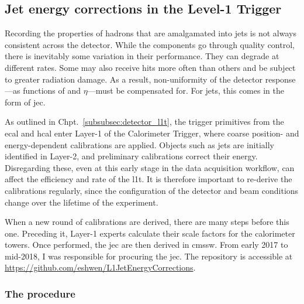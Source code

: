 

\subsection{Jet energy corrections in the Level-1 Trigger}
\label{subsec:detector_jecs}

Recording the properties of hadrons that are amalgamated into \glspl{jet} is not always consistent across the detector. While the components go through quality control, there is inevitably some variation in their performance. They can degrade at different rates. Some may also receive hits more often than others and be subject to greater radiation damage. As a result, non-uniformity of the detector response---as functions of \pt and $\eta$---must be compensated for. For \glspl{jet}, this comes in the form of \gls{jec}.

As outlined in Chpt.~\ref{subsubsec:detector_l1t}, the trigger primitives from the \acrshort{ecal} and \acrshort{hcal} enter Layer-1 of the Calorimeter Trigger, where coarse position- and energy-dependent calibrations are applied. Objects such as \glspl{jet} are initially identified in Layer-2, and preliminary calibrations correct their energy. Disregarding these, even at this early stage in the data acquisition workflow, can affect the efficiency and rate of the \acrlong{l1t}. It is therefore important to re-derive the calibrations regularly, since the configuration of the detector and beam conditions change over the lifetime of the experiment.

When a new round of calibrations are derived, there are many steps before this one. Preceding it, Layer-1 experts calculate their scale factors for the calorimeter towers. Once performed, the \acrlong{jec} are then derived in \acrshort{cmssw}. From early 2017 to mid-2018, I was responsible for procuring the \acrshort{jec}. The repository is accessible at \url{https://github.com/eshwen/L1JetEnergyCorrections}.




\subsubsection{The procedure}
\label{subsubsec:detector_jec_procedure}

